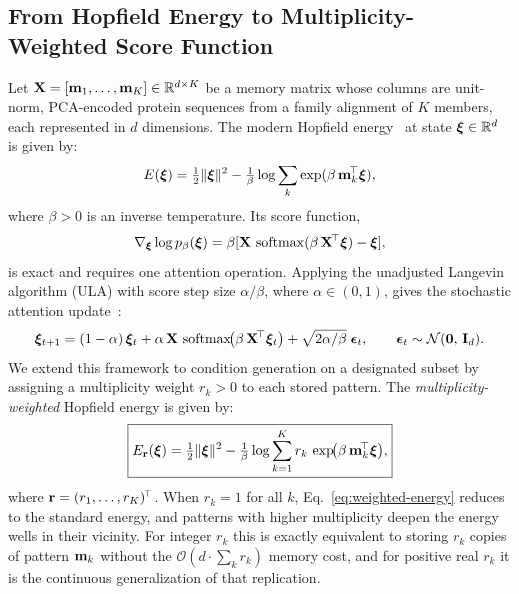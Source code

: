 \subsection{From Hopfield Energy to Multiplicity-Weighted Score Function}\label{sec:theory}

Let $\mathbf{X} = [\mathbf{m}_1, \ldots, \mathbf{m}_K] \in \mathbb{R}^{d \times K}$ be a memory matrix whose columns are
unit-norm, PCA-encoded protein sequences from a family alignment of $K$ members, each represented
in $d$ dimensions. The modern Hopfield energy~\cite{ramsauerHopfieldNetworksAll2021} at state
$\bm{\xi} \in \mathbb{R}^d$ is given by:
\[
E(\bm{\xi}) = \tfrac{1}{2}\|\bm{\xi}\|^{2}
- \tfrac{1}{\beta}\log\sum_{k}\exp(\beta\,\mathbf{m}_{k}^{\!\top}\bm{\xi}),
\]
where $\beta > 0$ is an inverse temperature. Its score function,
\[
\nabla_{\bm{\xi}}\log p_{\beta}(\bm{\xi})
= \beta[\mathbf{X}\,\operatorname{softmax}(\beta\,\mathbf{X}^{\!\top}\bm{\xi}) - \bm{\xi}],
\]
is exact and requires one attention operation. Applying the unadjusted Langevin algorithm
(ULA) with score step size $\alpha/\beta$, where $\alpha \in (0,1)$, gives the stochastic
attention update~\cite{varnerSAProtein2026}:
\begin{equation}\label{eq:ula}
  \bm{\xi}_{t+1}
    = (1-\alpha)\,\bm{\xi}_{t}
    + \alpha\,\mathbf{X}\,\operatorname{softmax}\!\bigl(\beta\,\mathbf{X}^{\!\top}\bm{\xi}_{t}\bigr)
    + \sqrt{2\alpha/\beta}\;\bm{\epsilon}_{t},
  \qquad \bm{\epsilon}_{t} \sim \mathcal{N}(\mathbf{0},\,\mathbf{I}_{d}).
\end{equation}
We extend this framework to condition generation on a designated subset by assigning a
multiplicity weight $r_k > 0$ to each stored pattern. The \emph{multiplicity-weighted} Hopfield
energy is given by:
\begin{equation}\label{eq:weighted-energy}
  \boxed{
  E_{\mathbf{r}}(\bm{\xi}) = \tfrac{1}{2}\|\bm{\xi}\|^{2}
    - \tfrac{1}{\beta}\log\sum_{k=1}^{K} r_k\,\exp\!\bigl(\beta\,\mathbf{m}_{k}^{\!\top}\bm{\xi}\bigr),}
\end{equation}
where $\mathbf{r} = (r_1, \ldots, r_K)^{\!\top}$.
When $r_k = 1$ for all $k$, Eq.~\eqref{eq:weighted-energy} reduces to the standard energy, and
patterns with higher multiplicity deepen the energy wells in their vicinity. For integer $r_k$
this is exactly equivalent to storing $r_k$ copies of pattern $\mathbf{m}_k$ without the
$\mathcal{O}(d \cdot \sum_k r_k)$ memory cost, and for positive real $r_k$ it is the continuous
generalization of that replication.

